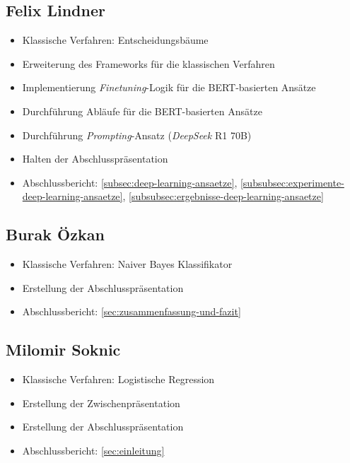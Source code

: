 \begin{multicols}{2}
\subsection{Felix Lindner}
\begin{itemize}
    \item Klassische Verfahren: Entscheidungsbäume
    \item Erweiterung des Frameworks für die klassischen Verfahren
    \item Implementierung \textit{Finetuning}-Logik für die BERT-basierten Ansätze
    \item Durchführung Abläufe für die BERT-basierten Ansätze
    \item Durchführung \textit{Prompting}-Ansatz (\textit{DeepSeek} R1 70B)
    \item Halten der Abschlusspräsentation
    \item Abschlussbericht: \ref{subsec:deep-learning-ansaetze}, \ref{subsubsec:experimente-deep-learning-ansaetze}, \ref{subsubsec:ergebnisse-deep-learning-ansaetze}
\end{itemize}

\subsection{Burak Özkan}
\begin{itemize}
    \item Klassische Verfahren: Naiver Bayes Klassifikator
    \item Erstellung der Abschlusspräsentation
    \item Abschlussbericht: \ref{sec:zusammenfassung-und-fazit}
\end{itemize}

\subsection{Milomir Soknic}
\begin{itemize}
    \item Klassische Verfahren: Logistische Regression
    \item Erstellung der Zwischenpräsentation
    \item Erstellung der Abschlusspräsentation
    \item Abschlussbericht: \ref{sec:einleitung}
\end{itemize}

\end{multicols}
